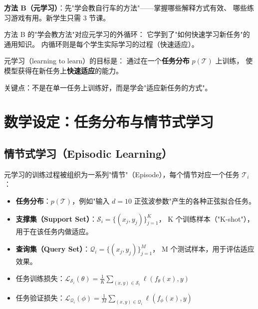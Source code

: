 \textbf{方法 B（元学习）}：先"学会教自行车的方法"——掌握哪些解释方式有效、
哪些练习游戏有用。新学生只需 3 节课。

方法 B 的"学会教方法"对应元学习的外循环：
它学到了"如何快速学习新任务"的通用知识。
内循环则是每个学生实际学习的过程（快速适应）。

\begin{definition}
元学习（learning to learn）的目标是：
通过在一个\textbf{任务分布} $p(\mathcal{T})$ 上训练，
使模型获得在新任务上\textbf{快速适应}的能力。

关键点：不是在单一任务上训练好，而是学会"适应新任务的方式"。
\end{definition}

\section{数学设定：任务分布与情节式学习}
\label{sec:metalearning_setup}

\subsection*{情节式学习（Episodic Learning）}

元学习的训练过程被组织为一系列"情节"（Episode），每个情节对应一个任务 $\mathcal{T}_i$：

\begin{definition}[情节式学习设定]
\begin{itemize}
  \item \textbf{任务分布}：$p(\mathcal{T})$，例如"输入 $d=10$ 正弦波参数"产生的各种正弦拟合任务。
  \item \textbf{支撑集（Support Set）}：$\mathcal{S}_i = \{(x_j, y_j)\}_{j=1}^K$，
        K 个训练样本（"K-shot"），用于在该任务内做适应。
  \item \textbf{查询集（Query Set）}：$\mathcal{Q}_i = \{(x_j, y_j)\}_{j=1}^M$，
        M 个测试样本，用于评估适应效果。
  \item 任务训练损失：$\mathcal{L}_{\mathcal{S}_i}(\theta) = \frac{1}{K} \sum_{(x,y) \in \mathcal{S}_i} \ell(f_\theta(x), y)$
  \item 任务验证损失：$\mathcal{L}_{\mathcal{Q}_i}(\phi) = \frac{1}{M} \sum_{(x,y) \in \mathcal{Q}_i} \ell(f_\phi(x), y)$
\end{itemize}
\end{definition}

